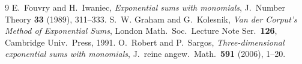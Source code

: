 \documentclass[11pt]{article}
\theoremstyle{remark}
\begin{document}
\begin{thebibliography}{9}
 E.~Fouvry and H.~Iwaniec, \emph{Exponential sums with
monomials}, J.~Number Theory \textbf{33} (1989), 311--333.
 S.~W. Graham and G.~Kolesnik, \emph{Van der Corput's
Method of Exponential Sums}, London Math.\ Soc.\ Lecture Note Ser.\
\textbf{126}, Cambridge Univ.\ Press, 1991.
 O.~Robert and P.~Sargos, \emph{Three-dimensional
exponential sums with monomials}, J.~reine angew.\ Math.\ \textbf{591}
(2006), 1--20.
\end{thebibliography}
\end{document}
